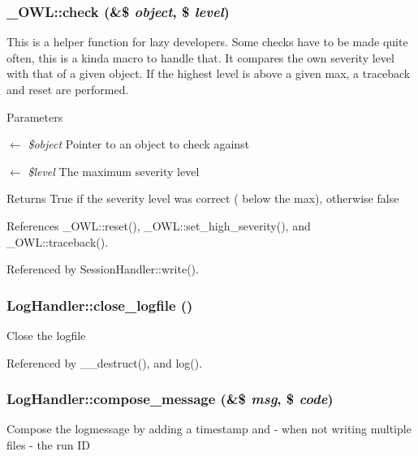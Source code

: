 \subsubsection[{check}]{\setlength{\rightskip}{0pt plus 5cm}\_\-OWL::check (\&\$ {\em object}, \/  \$ {\em level})}\label{class__OWL_ad6f4f6946f40199dd0333cf219fa500e}
This is a helper function for lazy developers. Some checks have to be made quite often, this is a kinda macro to handle that. It compares the own severity level with that of a given object. If the highest level is above a given max, a traceback and reset are performed.


\begin{DoxyParams}{Parameters}
\item[\mbox{$\leftarrow$} {\em \$object}]Pointer to an object to check against \item[\mbox{$\leftarrow$} {\em \$level}]The maximum severity level \end{DoxyParams}
\begin{DoxyReturn}{Returns}
True if the severity level was correct ( below the max), otherwise false 
\end{DoxyReturn}


References \_\-OWL::reset(), \_\-OWL::set\_\-high\_\-severity(), and \_\-OWL::traceback().



Referenced by SessionHandler::write().

\subsubsection[{close\_\-logfile}]{\setlength{\rightskip}{0pt plus 5cm}LogHandler::close\_\-logfile ()}\label{classLogHandler_a1a3b03d9bb97404a4f746bd2aacc5a8c}
Close the logfile 

Referenced by \_\-\_\-destruct(), and log().

\subsubsection[{compose\_\-message}]{\setlength{\rightskip}{0pt plus 5cm}LogHandler::compose\_\-message (\&\$ {\em msg}, \/  \$ {\em code})}\label{classLogHandler_ad32511521115b21779d699c836197dd0}
Compose the logmessage by adding a timestamp and -\/ when not writing multiple files -\/ the run ID


